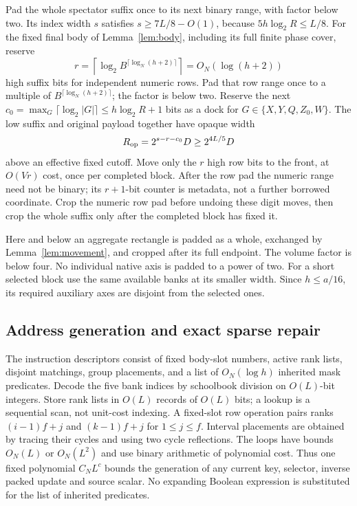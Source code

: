 Pad the whole spectator suffix once to its next binary range, with
factor below two. Its index width $s$ satisfies $s\ge7L/8-O(1)$,
because $5h\log_2R\le L/8$. For the fixed final body of
Lemma~\ref{lem:body}, including its full finite phase cover, reserve
\[
 r=\left\lceil\log_2 B^{\lceil\log_N(h+2)\rceil}\right\rceil
       =O_N(\log(h+2))
\]
high suffix bits for independent numeric rows. Pad that row range
once to a multiple of $B^{\lceil\log_N(h+2)\rceil}$; the factor is
below two. Reserve the next
$c_0=\max_G\lceil\log_2|G|\rceil\le h\log_2R+1$
bits as a dock for $G\in\{X,Y,Q,Z_0,W\}$. The low suffix and
original payload together have opaque width
\[
 R_{\rm op}=2^{s-r-c_0}D\ge2^{4L/5}D
\]
above an effective fixed cutoff. Move only the $r$ high row bits to
the front, at $O(Vr)$ cost, once per completed block. After the row
pad the numeric range need not be binary; its $r+1$-bit counter is
metadata, not a further borrowed coordinate. Crop the numeric row
pad before undoing these digit moves, then crop the whole suffix
only after the completed block has fixed it.

Here and below an aggregate rectangle is padded as a whole, exchanged
by Lemma~\ref{lem:movement}, and cropped after its full endpoint.
The volume factor is below four. No individual native axis is padded
to a power of two. For a short selected block use the same available
banks at its smaller width. Since $h\le a/16$, its required auxiliary
axes are disjoint from the selected ones.

\subsection{Address generation and exact sparse repair}
The instruction descriptors consist of fixed body-slot numbers, active
rank lists, disjoint matchings, group placements, and a list of
$O_N(\log h)$ inherited mask predicates. Decode the five bank indices
by schoolbook division on $O(L)$-bit integers. Store rank lists in
$O(L)$ records of $O(L)$ bits; a lookup is a sequential scan, not
unit-cost indexing. A fixed-slot row operation pairs ranks
$(i-1)f+j$ and $(k-1)f+j$ for $1\le j\le f$. Interval placements
are obtained by tracing their cycles and using two cycle reflections.
The loops have bounds $O_N(L)$ or $O_N(L^2)$ and use binary arithmetic
of polynomial cost. Thus one fixed polynomial $C_NL^c$ bounds the
generation of any current key, selector, inverse packed update and
source scalar. No expanding Boolean expression is substituted for
the list of inherited predicates.

